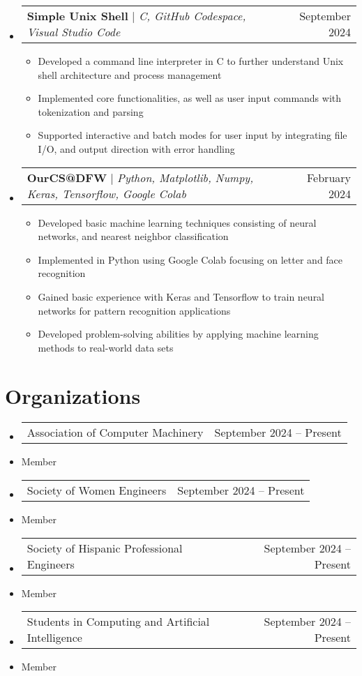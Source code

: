 \documentclass[letterpaper,11pt]{article}
\makeatletter
\newcommand{\resumeItem}[1]{
  \item\small{
    {#1 \vspace{-2pt}}
  }
}
\newcommand{\resumeProjectHeading}[2]{
    \item
    \begin{tabular*}{0.97\textwidth}{l@{\extracolsep{\fill}}r}
      \small#1 & #2 \\
    \end{tabular*}\vspace{-7pt}
}
\newcommand{\resumeSubHeadingListStart}{\begin{itemize}[leftmargin=0.15in, label={}]}
\newcommand{\resumeSubHeadingListEnd}{\end{itemize}}
\newcommand{\resumeItemListStart}{\begin{itemize}}
\newcommand{\resumeItemListEnd}{\end{itemize}\vspace{-5pt}}
\makeatother
\begin{document}
\resumeSubHeadingListStart
\resumeProjectHeading
    {\textbf{Simple Unix Shell} $|$ \emph{C, GitHub Codespace, Visual Studio Code}}{September 2024}
    \resumeItemListStart
        \resumeItem{Developed a command line interpreter in C to further understand Unix shell architecture and process management}
        \resumeItem{Implemented core functionalities, as well as user input commands with tokenization and parsing}
        \resumeItem{Supported interactive and batch modes for user input by integrating file I/O, and output direction with error handling}
    \resumeItemListEnd
\resumeSubHeadingListEnd

\resumeSubHeadingListStart
\resumeProjectHeading
    {\textbf{OurCS@DFW} $|$ \emph{Python, Matplotlib, Numpy, Keras, Tensorflow, Google Colab}}{February 2024}
    \resumeItemListStart
      \resumeItem{Developed basic machine learning techniques consisting of neural networks, and nearest neighbor classification}
      \resumeItem{Implemented in Python using Google Colab focusing on letter and face recognition}
      \resumeItem{Gained basic experience with Keras and Tensorflow to train neural networks for pattern recognition applications}
      \resumeItem{Developed problem-solving abilities by applying machine learning methods to real-world data sets}
    \resumeItemListEnd
\resumeSubHeadingListEnd


\section{Organizations}

\resumeSubHeadingListStart

\resumeProjectHeading
    {{Association of Computer Machinery} \emph}{\small September 2024 -- Present}
    \resumeItem \small{Member}
\resumeProjectHeading
    {{Society of Women Engineers} \emph}{September 2024 -- Present}
    \resumeItem \small{Member}
\resumeProjectHeading
    {{Society of Hispanic Professional Engineers} \emph}{September 2024 -- Present}  
    \resumeItem \small{Member}
\resumeProjectHeading
    {{Students in Computing and Artificial Intelligence} \emph}{September 2024 -- Present}
    \resumeItem \small{Member}
\resumeSubHeadingListEnd

\end{document}

